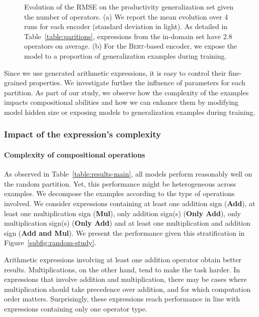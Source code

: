 \begin{figure}[htb!]
\begin{subfigure}[b]{7.52cm}
        \caption{}
        \label{fig:productivity-exposition}
    \end{subfigure}
    \caption{Evolution of the RMSE on the productivity generalization set given the number of operators. (a) We report the mean evolution over 4 runs for each encoder (standard deviation in light). As detailed in Table~\ref{table:paritions}, expressions from the in-domain set have 2.8 operators on average. (b) For the \textsc{Bert}-based encoder, we expose the model to a proportion of generalization examples during training.}
\end{figure}

Since we use generated arithmetic expressions, it is easy to control their fine-grained properties. We investigate further the influence of parameters for each partition. As part of our study, we observe how the complexity of the examples impacts compositional abilities and how we can enhance them by modifying model hidden size or exposing models to generalization examples during training.

\subsubsection{Impact of the expression's complexity}

\paragraph{Complexity of compositional operations} As observed in Table~\ref{table:results-main}, all models perform reasonably well on the random partition. Yet, this performance might be heterogeneous across examples. We decompose the examples according to the type of operations involved. We consider expressions containing at least one addition sign (\textbf{Add}), at least one multiplication sign (\textbf{Mul}), only addition sign(s) (\textbf{Only Add}), only multiplication sign(s) (\textbf{Only Add}) and at least one multiplication and addition sign (\textbf{Add and Mul}). We present the performance given this stratification in Figure~\ref{subfig:random-study}.

Arithmetic expressions involving at least one addition operator obtain better results. Multiplications, on the other hand, tend to make the task harder. In expressions that involve addition and multiplication, there may be cases where multiplication should take precedence over addition, and for which computation order matters. Surprisingly, these expressions reach performance in line with expressions containing only one operator type. 

